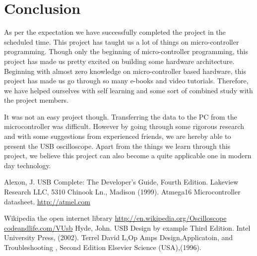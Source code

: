 \documentclass[12pt,a4paper]{article}
\begin{document}
\section{Conclusion}
As per the expectation we have successfully completed the project in the scheduled time. This project has taught us a lot of things on micro-controller programming. Though only the beginning of micro-controller programming, this project has made us pretty excited on building some hardware architecture. Beginning with almost zero knowledge on micro-controller based hardware, this project has made us go through so many e-books and video tutorials. Therefore, we have helped ourselves with self learning and some sort of combined study with the project members.

It was not an easy project though. Transferring the data to the PC from the microcontroller was difficult. However by going through some rigorous research and with some suggestions from experienced friends, we are hereby able to present the USB oscilloscope.
Apart from the things we learn through this project, we believe this project can also become a quite applicable one in modern day technology. 

\pagebreak


\begin{thebibliography}{99}
\bibitem{} Alexon, J. USB Complete: The Developer’s Guide, Fourth Edition. Lakeview Research LLC, 5310 Chinook Ln., Madison  (1999).
\bibitem{} Atmega16 Microcontroller datasheet. \url{http://atmel.com}

\bibitem{} Wikipedia the open internet library \url{http://en.wikipedia.org/Oscilloscope}
\bibitem{} \url{codeandlife.com/VUsb}
\bibitem{} Hyde, John. USB Design by example Third Edition. Intel University Press, (2002).
\bibitem{} Terrel David L,Op Amps Design,Applicatoin, and Troubleshooting , Second Edition Elsevier Science (USA),(1996).

\end{thebibliography}
\end{document}

